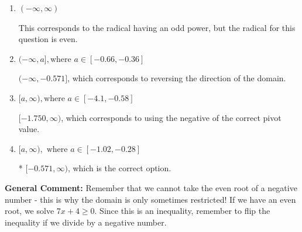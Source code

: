 \documentclass{extbook}[14pt]
\begin{document}
\begin{enumerate}
{\begin{enumerate}[label=\Alph*.]
$(-\infty, -1.750]$, which corresponds to reversing the direction of the domain AND using the negative of the correct pivot value.
\item \( (-\infty, \infty) \)

This corresponds to the radical having an odd power, but the radical for this question is even.
\item \( (-\infty, a], \text{where } a \in [-0.66, -0.36] \)

 $(-\infty, -0.571]$, which corresponds to reversing the direction of the domain.
\item \( [a, \infty), \text{where } a \in [-4.1, -0.58] \)

$[-1.750, \infty)$, which corresponds to using the negative of the correct pivot value.
\item \( [a, \infty), \text{ where } a \in [-1.02, -0.28] \)

* $[-0.571, \infty)$, which is the correct option.
\end{enumerate}

\textbf{General Comment:} Remember that we cannot take the even root of a negative number - this is why the domain is only sometimes restricted! If we have an even root, we solve $7 x + 4 \geq 0$. Since this is an inequality, remember to flip the inequality if we divide by a negative number.
}
\end{enumerate}
\end{document}
